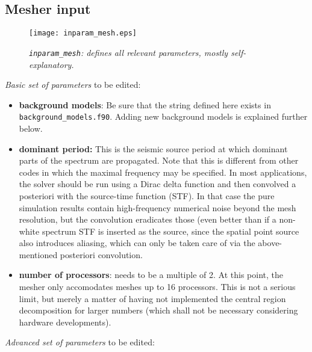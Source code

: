 \documentclass[11pt,letter,fleqn,english,notitlepage]{article}
\begin{document}
\subsection{Mesher input}
\begin{figure*}[htb]
\begin{center}
\texttt{[image: inparam\_mesh.eps]}
\caption{\textit{{\tt inparam\_mesh}: defines all relevant parameters, mostly self-explanatory. }}
\end{center}
\end{figure*}

\noindent \textit{Basic set of parameters} to be edited:
\begin{itemize}
\item \textbf{background models}: Be sure that the string defined here exists in 
{\tt background\_models.f90}. Adding new background models is explained further below.

\item \textbf{dominant period:} This is the seismic source period at which dominant parts 
of the spectrum are propagated. Note that this is different from other codes in which the 
maximal frequency may be specified. 
In most applications, the solver should be run using a Dirac 
delta function and then convolved a posteriori with the source-time function (STF). In that 
case the pure simulation results contain high-frequency numerical noise beyond the mesh 
resolution, but the convolution eradicates those (even better than if a non-white spectrum 
STF is inserted as the source, since the spatial point source also introduces aliasing, which 
can only be taken care of via the above-mentioned posteriori convolution.

\item \textbf{number of processors}: needs to be a multiple of 2. At this point, the mesher 
only accomodates meshes up to 16 processors. This is not a serious limit, but 
merely a matter of having not implemented the central region decomposition 
for larger numbers (which shall not be necessary considering hardware developments).
\end{itemize}
\newpage
\noindent \textit{Advanced set of parameters} to be edited:
\end{document}
